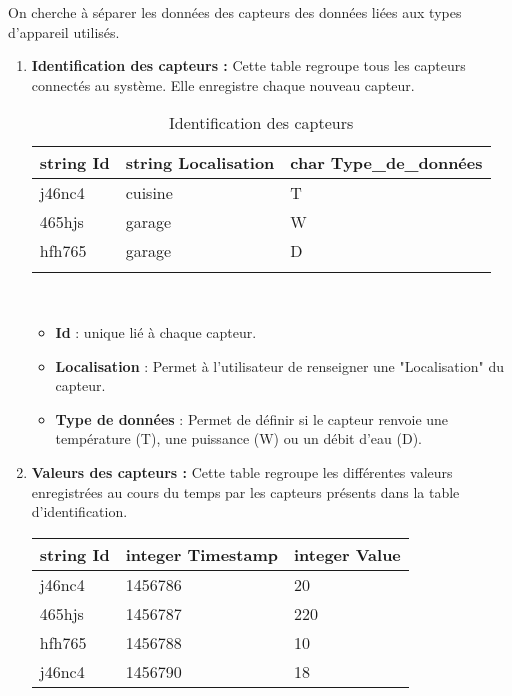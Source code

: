 \documentclass[10pt,a4paper]{article}
\begin{document}
On cherche à séparer les données des capteurs des données liées aux types d'appareil utilisés.
\begin{enumerate}
\item \textbf{Identification des capteurs :} Cette table regroupe tous les capteurs connectés au système. Elle enregistre chaque nouveau capteur.
\begin{table}[h!]
    \centering
    \begin{tabular}{|l|l|l|}
    \hline
    \rowcolor[HTML]{EFEFEF} 
    string Id & string Localisation & char Type\_de\_données \\ \hline
    j46nc4    & cuisine             & T                      \\ \hline
    465hjs    & garage              & W                      \\ \hline
    hfh765    & garage              & D                      \\ \hline
              &                     &                       
    \end{tabular}
    \caption{Identification des capteurs}
\end{table}
\\
\begin{itemize}
\item \textbf{Id} : unique lié à chaque capteur.
\item \textbf{Localisation} : Permet à l'utilisateur de renseigner une "Localisation" du capteur.
\item \textbf{Type de données} : Permet de définir si le capteur renvoie une température (T), une puissance (W) ou un débit d'eau (D).
\end{itemize}
\newpage
\item \textbf{Valeurs des capteurs :} Cette table regroupe les différentes valeurs enregistrées au cours du temps par les capteurs présents dans la table d'identification.
\begin{table}[h!]
\centering
    \begin{tabular}{|l|l|l|}
    \hline
    \rowcolor[HTML]{EFEFEF} 
    string Id & integer Timestamp & integer Value \\ \hline
    j46nc4    & 1456786           & 20            \\ \hline
    465hjs    & 1456787           & 220           \\ \hline
    hfh765    & 1456788           & 10            \\ \hline
    j46nc4    & 1456790           & 18            \\ \hline

\end{tabular}
\end{table}
\end{enumerate}
\end{document}
